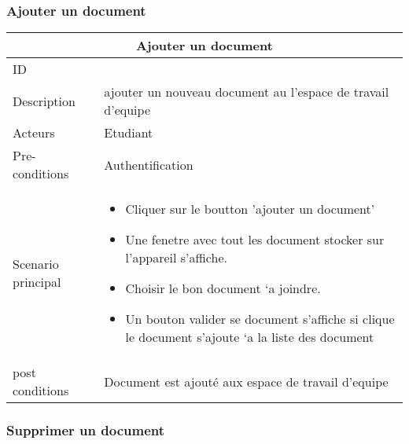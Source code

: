 \documentclass[11pt,fleqn]{book} %
\begin{document}
\subsubsection{Ajouter un document}
\begin{center}
\begin{tabularx}{1\textwidth} { | p{4cm} | >{\raggedright\arraybackslash}X |  }
  \hline
  \multicolumn{2}{|c|}{Ajouter un document} \\
 \hline
 ID & 1  \\
 \hline
 Description  & ajouter un nouveau document au l'espace de travail d'equipe \\
  \hline
 Acteurs  & Etudiant   \\
  \hline
 Pre-conditions  & Authentification\\
 \hline
 Scenario principal  &  
 \begin{itemize}
     \item Cliquer sur le boutton ’ajouter un document' 
     \item Une fenetre avec tout les document stocker sur l’appareil s’affiche.
     \item Choisir le bon document `a joindre.
     \item Un bouton valider se document s’affiche si clique le document s’ajoute `a la liste des document

 \end{itemize}\\
  \hline
 post conditions  &  Document est ajouté aux espace de travail d'equipe  \\
  \hline
\end{tabularx}
\label{tbl:nicetablelesstable}
\end{center}
\subsubsection{Supprimer un document}
\end{document}
